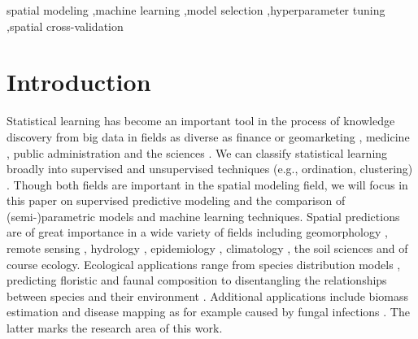 \documentclass[review]{elsarticle}
\begin{document}
\begin{frontmatter}
	\begin{keyword}
		spatial modeling \sep machine learning \sep model selection \sep hyperparameter tuning \sep spatial cross-validation
	\end{keyword}

\end{frontmatter}

\linenumbers

\begin{acronym}[AUROC]

\end{acronym}

\section{Introduction}
\label{sec:intro}
Statistical learning has become an important tool in the process of knowledge discovery from big data in fields as diverse as finance or geomarketing \citep{Heaton2016, Schernthanner2017}, medicine \citep{Leung2016}, public administration \citep{Maenner2016} and the sciences \citep{Garofalo2016}.
We can classify statistical learning broadly into supervised and unsupervised techniques (e.g., ordination, clustering) \citep{James2013}.
Though both fields are important in the spatial modeling field, we will focus in this paper on supervised predictive modeling and the comparison of (semi-)parametric models and machine learning techniques.
Spatial predictions are of great importance in a wide variety of fields including geomorphology \citep{brenning_landslide_2015}, remote sensing \citep{Stelmaszczuk2017}, hydrology \citep{Naghibi2016}, epidemiology \citep{Alder2017}, climatology \citep{Voyant2017}, the soil sciences \citep{Hengl2017} and of course ecology.
Ecological applications range from species distribution models \citep{Halvorsen2016, Quillfeldt2017, Wieland2017}, predicting floristic \citep{muenchow_coupling_2013} and faunal composition to disentangling the relationships between species and their environment \citep{muenchow_soil_2013}.
Additional applications include biomass estimation \citep{Fassnacht2014} and disease mapping as for example caused by fungal infections \citep{Iturritxa2014}.
The latter marks the research area of this work.
\end{document}

